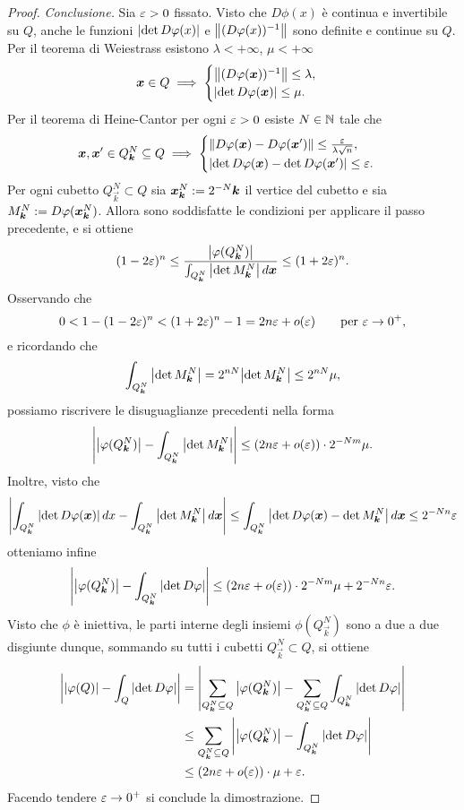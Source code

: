 \begin{proof}
\emph{Conclusione.}
Sia $\varepsilon>0$ fissato. 
Visto che $D\phi(x)$ è continua e invertibile su $Q$,
anche le funzioni ${\left|\det D\varphi(x)\right|}$ e ${\left\Vert (D\varphi(x))^{-1}\right\Vert}$
sono definite e continue su $Q$. 
Per il teorema di Weiestrass 
esistono $\lambda<+\infty$, $\mu<+\infty$ 
\[
 \boldsymbol x \in Q \implies 
 \begin{cases}
  {\left\Vert (D\varphi(\boldsymbol x))^{-1}\right\Vert} \le \lambda,\\
  {\left|\det D\varphi(\boldsymbol x)\right|} \le \mu.
 \end{cases}
\]
Per il teorema di Heine-Cantor  
per ogni $\varepsilon>0$ esiste $N\in {\mathbb N}$ tale che 
\[
 \boldsymbol x, \boldsymbol x' \in Q^N_{\boldsymbol k}\subseteq Q \implies
 \begin{cases}
  {\left\Vert D\varphi(\boldsymbol x) - D\varphi(\boldsymbol x')\right\Vert} \le \frac{\varepsilon}{\lambda \sqrt n},\\
  {\left|\det D\varphi(\boldsymbol x) - \det D\varphi(\boldsymbol x')\right|} \le \varepsilon.
 \end{cases}
\]
Per ogni cubetto $Q^N_{\vec k} \subset Q$ sia $\boldsymbol x^N_{\boldsymbol k} := 2^{-N}\boldsymbol k$ 
il vertice del cubetto e sia $M^N_{\boldsymbol k} := D\varphi(\boldsymbol x^N_{\boldsymbol k})$.
Allora sono soddisfatte le condizioni per applicare il passo precedente, e si 
ottiene 
\[
(1-2\varepsilon)^n \le \frac{{\left|\varphi(Q^N_{\boldsymbol k})\right|}}{\int_{Q^N_{\boldsymbol k}}{\left|\det M^N_{\boldsymbol k}\right|}\, d\boldsymbol x} \le (1+2\varepsilon)^n.
\]
Osservando che 
\[
 0 < 1-(1-2\varepsilon)^n < (1+2\varepsilon)^n - 1 = 2n\varepsilon + o(\varepsilon) \qquad \text{per $\varepsilon\to 0^+$},
\]
e ricordando che
\[
\int_{Q^N_{\boldsymbol k}} {\left|\det M^N_{\boldsymbol k}\right|}
= 2^{nN} {\left|\det M^N_{\boldsymbol k}\right|} \le 2^{nN} \mu,
\]
possiamo riscrivere le disuguaglianze precedenti nella forma
\[
{\left|{\left|\varphi(Q^N_{\boldsymbol k})\right|} - \int_{Q^N_{\boldsymbol k}} {\left|\det M^N_{\boldsymbol k}\right|}\right|}
\le (2n\varepsilon + o(\varepsilon))\cdot 2^{-Nm} \mu.
\]
Inoltre, visto che
\[
 {\left|\int_{Q^N_{\boldsymbol k}} {\left|\det D\varphi(\boldsymbol x)\right|}\, dx - 
 \int_{Q^N_{\boldsymbol k}} {\left|\det M^N_{\boldsymbol k}\right|}\, d\boldsymbol x\right|}
 \le \int_{Q^N_{\boldsymbol k}} {\left|\det D\varphi(\boldsymbol x) - \det M^N_{\boldsymbol k}\right|}\, d\boldsymbol x
 \le 2^{-Nn} \varepsilon
\]
otteniamo infine 
\[
{\left|{\left|\varphi(Q^N_{\boldsymbol k})\right|} - \int_{Q^N_{\boldsymbol k}} {\left|\det D\varphi\right|}\right|}
\le (2n\varepsilon + o(\varepsilon))\cdot 2^{-Nm} \mu + 2^{-Nn} \varepsilon.
\]
Visto che $\phi$ è iniettiva, 
le parti interne degli insiemi $\phi(Q^N_{\vec k})$ sono a due a due disgiunte 
dunque, sommando su tutti i cubetti $Q^N_{\vec k}\subset Q$,
si ottiene
\begin{align*}
{\left|{\left|\varphi(Q)\right|} - \int_Q {\left|\det D\varphi\right|}\right|}
&={\left|\sum_{Q^N_{\boldsymbol k}\subseteq Q}
  {\left|\varphi(Q^N_{\boldsymbol k})\right|} - \sum_{Q^N_{\boldsymbol k}\subseteq Q}\int_{Q^N_{\boldsymbol k}} {\left|\det D\varphi\right|}\right|} \\
&\le \sum_{Q^N_{\boldsymbol k}\subseteq Q} 
  {\left|{\left|\varphi(Q^N_{\boldsymbol k})\right|} - \int_{Q^N_{\boldsymbol k}} {\left|\det D\varphi\right|}\right|}\\
  &\le (2n\varepsilon + o(\varepsilon))\cdot \mu + \varepsilon.
\end{align*}
Facendo tendere $\varepsilon\to 0^+$ si conclude la dimostrazione.
\end{proof}


